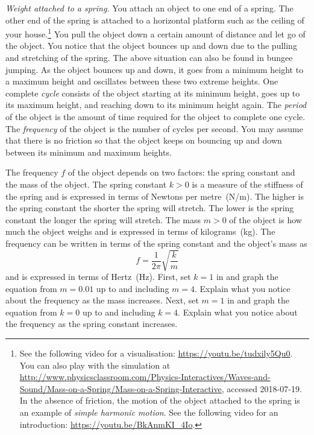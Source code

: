 \documentclass[a4paper,oneside,12pt]{article}
\begin{document}
\begin{problem}
\item\label{prob:trigonometric:spring_oscillation}
  \emph{Weight attached to a spring.}
  You attach an object to one end of a spring.  The other end of the
  spring is attached to a horizontal platform such as the ceiling of
  your house.\footnote{
    See the following video for a visualisation:
    \url{https://youtu.be/tudxily5Qu0}.
    You can also play with the simulation at
    \url{http://www.physicsclassroom.com/Physics-Interactives/Waves-and-Sound/Mass-on-a-Spring/Mass-on-a-Spring-Interactive},
    accessed 2018-07-19.  In the absence of friction, the motion of
    the object attached to the spring is an example of
    \emph{simple harmonic motion}.  See the following video for an
    introduction:
    \url{https://youtu.be/BkAnmKI_4Io}.
  }
  You pull the object down a certain amount of distance and let go of
  the object.  You notice that the object bounces up and down due to
  the pulling and stretching of the spring.  The above situation can
  also be found in bungee jumping.  As the object bounces up and down,
  it goes from a minimum height to a maximum height and oscillates
  between these two extreme heights.  One complete \emph{cycle}
  consists of the object starting at its minimum height, goes up to
  its maximum height, and reaching down to its minimum height again.
  The \emph{period} of the object is the amount of time required for
  the object to complete one cycle.  The \emph{frequency} of the
  object is the number of cycles per second.  You may assume that
  there is no friction so that the object keeps on bouncing up and
  down between its minimum and maximum heights.
  \begin{packedenum}
  \item\label{subprob:trigonometric:spring_frequency}
    The frequency $f$ of the object depends on two factors: the spring
    constant and the mass of the object.  The spring constant $k > 0$
    is a measure of the stiffness of the spring and is expressed in
    terms of Newtons per metre~(N/m).  The higher is the spring
    constant the shorter the spring will stretch.  The lower is the
    spring constant the longer the spring will stretch.  The mass
    $m > 0$ of the object is how much the object weighs and is
    expressed in terms of kilograms~(kg).  The frequency can be
    written in terms of the spring constant and the object's mass as
    \begin{equation}
    \label{eqn:trigonometric:spring_frequency}
    f
    =
    \frac{1}{2\pi}
    \sqrt{
      \frac{k}{m}
    }
    \end{equation}
    and is expressed in terms of Hertz~(Hz).  First, set $k = 1$ in
     and graph the
    equation from $m = 0.01$ up to and including $m = 4$.  Explain
    what you notice about the frequency as the mass increases.  Next,
    set $m = 1$ in  and
    graph the equation from $k = 0$ up to and including $k = 4$.
    Explain what you notice about the frequency as the spring constant
    increases.


\end{packedenum}
\end{problem}
\end{document}
